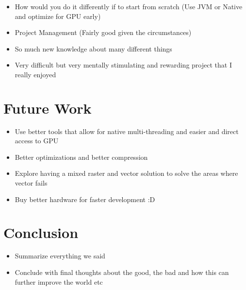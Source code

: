 \documentclass[12pt]{article}
\begin{document}
    \begin{itemize}
        \item How would you do it differently if to start from scratch (Use JVM or Native and optimize for GPU early)
        \item Project Management (Fairly good given the circumstances)
        \item So much new knowledge about many different things
        \item Very difficult but very mentally stimulating and rewarding project that I really enjoyed
    \end{itemize}

    \pagebreak


    \section{Future Work}\label{sec:future-work}

    \begin{itemize}
        \item Use better tools that allow for native multi-threading and easier and direct access to GPU
        \item Better optimizations and better compression
        \item Explore having a mixed raster and vector solution to solve the areas where vector fails
        \item Buy better hardware for faster development :D
    \end{itemize}

    \pagebreak


    \section{Conclusion}\label{sec:conclusion}

    \begin{itemize}
        \item Summarize everything we said
        \item Conclude with final thoughts about the good, the bad and how this can further improve the world etc
    \end{itemize}

    \pagebreak


    \printbibliography[heading=bibintoc,title={References}]

    \pagebreak
\end{document}
